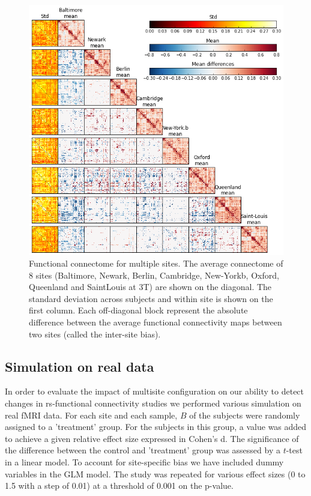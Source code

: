 \documentclass[authoryear]{elsarticle}
\begin{document}
\begin{figure}[tbp]
\begin{center}
\includegraphics[width=\linewidth]{../figures/connectome_multisite.png}
\end{center}
\caption[Connectome variability across sites]{
Functional connectome for multiple sites. The average connectome of 8 sites (Baltimore, Newark, Berlin, Cambridge, New-Yorkb, Oxford, Queenland and SaintLouis at 3T) are shown on the diagonal. The standard deviation across subjects and within site is shown on the first column. Each off-diagonal block represent the absolute difference between the average functional connectivity maps between two sites (called the inter-site bias).
}
\label{fig_connectome_variability}
\end{figure}

\subsection{Simulation on real data}

In order to evaluate the impact of multisite configuration on our ability to detect changes in rs-functional connectivity studies we performed various simulation on real fMRI data. For each site and each sample, $B$ of the subjects were randomly assigned to a 'treatment' group. For the subjects in this group, a value was added to achieve a given relative effect size expressed in Cohen's d. The significance of the difference between the control and 'treatment' group was assessed by a $t$-test in a linear model. To account for site-specific bias we have included dummy variables in the GLM model. The study was repeated for various effect sizes (0 to 1.5 with a step of 0.01) at a threshold of 0.001 on the p-value.
\end{document}
